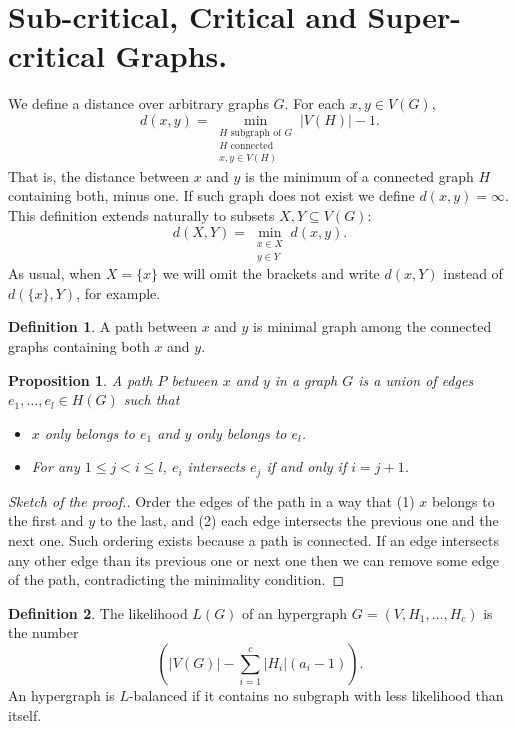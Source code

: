 \documentclass[11pt,notitlepage,a4paper]{article}
\newtheorem{proposition}{Proposition}[section]
\theoremstyle{definition}
\newtheorem{definition}{Definition}[section]
\begin{document}
\section{Sub-critical, Critical and Super-critical Graphs.}

We define a distance over arbitrary graphs $G$. For each $x, y\in V(G)$,
\[ d(x,y)= \min_{\substack{H \text{ subgraph of } G\\ 
H \text{ connected }\\
x,y\in V(H)}} |V(H)| - 1 .\]
That is, the distance between $x$ and $y$ is the minimum
of a connected graph $H$ containing both, minus one. 
If such graph does not exist we define $d(x,y)=\infty$.
This definition extends naturally to subsets $X,Y\subseteq V(G)$:
\[ d(X,Y)=\min_{\substack{x\in X\\ y\in Y}} d(x,y).\]
As usual, when $X=\{x\}$ we will omit the brackets and write
$d(x,Y)$ instead of $d(\{x\},Y)$, for example.  \par

\begin{definition} 
	A path between $x$ and $y$ is minimal graph among the connected graphs
	containing both $x$ and $y$. 
\end{definition}

\begin{proposition}\label{prop:pathform}
	A path $P$ between $x$ and $y$ in a graph $G$ is a union of 
	edges $e_1,\dots, e_l\in H(G)$ such that
	\begin{itemize}
		\item $x$ only belongs to
		$e_1$ and $y$ only belongs to $e_l$.
		\item For any $1\leq j < i\leq l$, $e_i$ intersects
		$e_j$ if and only if $i=j+1$.
	\end{itemize}  	
\end{proposition}
\begin{proof}[Sketch of the proof.]
	Order the edges of the path in a way that (1) 
	$x$ belongs to the first and $y$ to the last, and
	(2) each edge intersects the previous one and the next one. Such ordering exists because a path is connected.
	If an edge intersects any other edge than its previous one or next one then we can remove some edge of the path,
	contradicting the minimality condition.
\end{proof}

\begin{definition}
	The likelihood $L(G)$ of an hypergraph $G=(V,H_1,\dots,H_c)$ is
	the number
	\[ \left( |V(G)| - \sum_{i=1}^c |H_i|(a_i-1)\right).\]
	An hypergraph is $L$-balanced if it contains no subgraph with
	less likelihood than itself. 
\end{definition}
\end{document}
